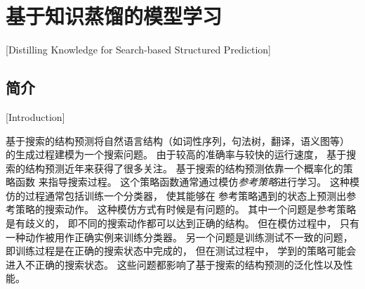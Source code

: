 \chapter{基于知识蒸馏的模型学习}[Distilling Knowledge for Search-based Structured Prediction]\label{chp:distill}

\section{简介}[Introduction]

基于搜索的结构预测将自然语言结构（如词性序列，句法树，翻译，语义图等）
的生成过程建模为一个搜索问题\cite{collins-roark:2004:ACL,
	liang-EtAl:2006:COLACL,
	zhang-clark:2008:EMNLP,
	huang-fayong-guo:2012:NAACL-HLT,
	NIPS2014_5346,
	goodman-vlachos-naradowsky:2016:P16-1}。
由于较高的准确率与较快的运行速度，
基于搜索的结构预测近年来获得了很多关注。
基于搜索的结构预测依靠一个概率化的策略函数
来指导搜索过程。
这个策略函数通常通过模仿\textit{参考策略}进行学习。
这种模仿的过程通常包括训练一个分类器，
使其能够在
参考策略遇到的状态上预测出参考策略的搜索动作。
这种模仿方式有时候是有问题的。
其中一个问题是参考策略是有歧义的，
即不同的搜索动作都可以达到正确的结构。
但在模仿过程中，
只有一种动作被用作正确实例来训练分类器\cite{goldberg-nivre:2012:PAPERS}。
另一个问题是训练测试不一致的问题，
即训练过程是在正确的搜索状态中完成的，
但在测试过程中，
学到的策略可能会进入不正确的搜索状态\cite{pmlr-v9-ross10a,pmlr-v15-ross11a}。
这些问题都影响了基于搜索的结构预测的泛化性以及性能。

